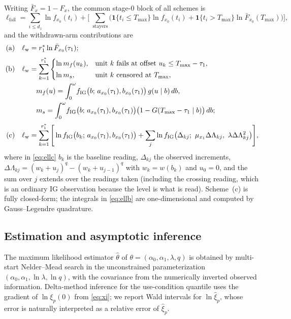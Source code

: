 \documentclass[11pt]{article}
\newcommand{\tmax}{T_{\max}}
\newcommand{\ind}[1]{\mathbf{1}\{#1\}}
\begin{document}
Writing $\bar F_x=1-F_x$, the common stage-0 block of all schemes is
\begin{equation}\label{eq:fail}
\ell_{\mathrm{fail}}=\sum_{i\le d_1}\ln f_{x_0}(t_i)
+\Bigg[\;\sum_{\text{stayers}}\!\!\Big(\ind{t_i\le\tmax}\ln f_{x_0}(t_i)
+\ind{t_i>\tmax}\ln \bar F_{x_0}(\tmax)\Big)\Bigg],
\end{equation}
and the withdrawn-arm contributions are
\begin{align}
\text{(a)}\quad & \ell_{\mathrm{w}}=r_1^{*}\ln \bar F_{x_0}(\tau_1); \label{eq:ella}\\[2pt]
\text{(b)}\quad & \ell_{\mathrm{w}}=\sum_{k=1}^{r_1^{*}}
\begin{cases}
\ln m_f(u_k), & \text{unit $k$ fails at offset } u_k\le \tmax-\tau_1,\\[2pt]
\ln m_s, & \text{unit $k$ censored at } \tmax,
\end{cases}\label{eq:ellb}\\
&\qquad m_f(u)=\int_0^{\omega}\! f_{\mathrm{IG}}\big(b;\,a_{x_0}(\tau_1),b_{x_0}(\tau_1)\big)\,
g(u\mid b)\,db, \notag\\
&\qquad m_s=\int_0^{\omega}\! f_{\mathrm{IG}}\big(b;\,a_{x_0}(\tau_1),b_{x_0}(\tau_1)\big)
\big(1-G(\tmax-\tau_1\mid b)\big)\,db; \notag\\[2pt]
\text{(c)}\quad & \ell_{\mathrm{w}}=\sum_{k=1}^{r_1^{*}}
\Bigg[\ln f_{\mathrm{IG}}\big(b_k;\,a_{x_0}(\tau_1),b_{x_0}(\tau_1)\big)
+\sum_{j}\ln f_{\mathrm{IG}}\big(\Delta_{kj};\ \mu_{x_1}\Delta\Lambda_{kj},\ \lambda\Delta\Lambda_{kj}^{2}\big)\Bigg],
\label{eq:ellc}
\end{align}
where in \eqref{eq:ellc} $b_k$ is the baseline reading, $\Delta_{kj}$ the observed increments,
$\Delta\Lambda_{kj}=(w_k+u_j)^{q}-(w_k+u_{j-1})^{q}$ with $w_k=w(b_k)$ and $u_0=0$, and the sum
over $j$ extends over the readings taken (including the crossing reading, which is an ordinary
IG observation because the level is what is read). Scheme~(c) is fully closed-form; the
integrals in \eqref{eq:ellb} are one-dimensional and computed by Gauss--Legendre quadrature.

\subsection{Estimation and asymptotic inference}

The maximum likelihood estimator $\hat\theta$ of $\theta=(\alpha_0,\alpha_1,\lambda,q)$ is
obtained by multi-start Nelder--Mead search in the unconstrained parameterization
$(\alpha_0,\alpha_1,\ln\lambda,\ln q)$, with the covariance from the numerically inverted
observed information. Delta-method inference for the use-condition quantile uses the gradient
of $\ln\xi_p(0)$ from \eqref{eq:xi}; we report Wald intervals for $\ln\hat\xi_p$, whose error is
naturally interpreted as a relative error of $\hat\xi_p$.
\end{document}
